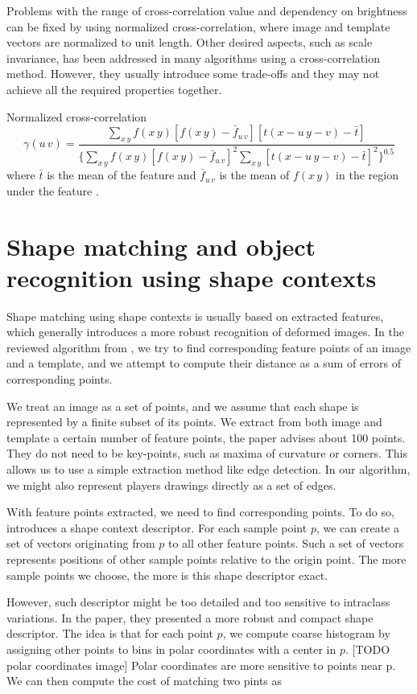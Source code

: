 Problems with the range of cross-correlation value and dependency on brightness can be fixed by using normalized cross-correlation, where image and template vectors are normalized to unit length. Other desired aspects, such as scale invariance, has been addressed in many algorithms using a cross-correlation method. However, they usually introduce some trade-offs and they may not achieve all the required properties together. 

Normalized cross-correlation
\begin{equation*}
\gamma(u\,v) = \frac{\sum_{x\,y}f(x\,y) [f(x\,y)-\bar{f}_{u\,v}][t(x-u\,y-v)-\bar{t}]} {\{ \sum_{x\,y}f(x\,y) [f(x\,y)-\bar{f}_{u\,v}]^2 \sum_{x\,y}[t(x-u\,y-v)-\bar{t}]^2  \}^{0.5}}
\end{equation*}
where $\bar{t}$ is the mean of the feature and $\bar{f}_{u\,v}$ is the mean of $f(x\,y)$ in the region under the feature \cite{crossCorrLewis}.

\section{Shape matching and object recognition using shape contexts}
Shape matching using shape contexts is usually based on extracted features, which generally introduces a more robust recognition of deformed images. In the reviewed algorithm from , we try to find corresponding feature points of an image and a template, and we attempt to compute their distance as a sum of errors of corresponding points.

We treat an image as a set of points, and we assume that each shape is represented by a finite subset of its points. We extract from both image and template a certain number of feature points, the paper advises about 100 points. They do not need to be key-points, such as maxima of curvature or corners. This allows us to use a simple extraction method like edge detection. In our algorithm, we might also represent players drawings directly as a set of edges. 

With feature points extracted, we need to find corresponding points. To do so, \citet{simple} introduces a shape context descriptor. For each sample point $p$, we can create a set of vectors originating from $p$ to all other feature points. Such a set of vectors represents positions of other sample points relative to the origin point. The more sample points we choose, the more is this shape descriptor exact.

However, such descriptor might be too detailed and too sensitive to intraclass variations. In the paper, they presented a more robust and compact shape descriptor. The idea is that for each point $p$, we compute coarse histogram by assigning other points to bins in polar coordinates with a center in $p$. [TODO polar coordinates image] Polar coordinates are more sensitive to points near p. We can then compute the cost of matching two pints as 

